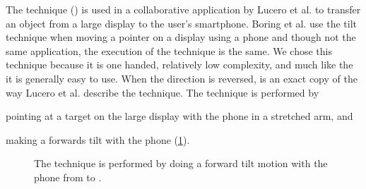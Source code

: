 The \tilt technique () is used in a collaborative application by Lucero et al. \cite{Lucero:2012} to transfer an object from a large display to the user's smartphone.
Boring et al. \cite{Boring:2009} use the tilt technique when moving a pointer on a display using a phone and though not the same application, the execution of the technique is the same.
We chose this technique because it is one handed, relatively low complexity, and much like the \swipe it is generally easy to use.
When the direction is reversed, \tilt is an exact copy of the way Lucero et al. describe the technique.
The \tilt technique is performed by 
\begin{enumerate*}[label=\itshape\roman*\upshape)]
	\item{pointing at a target on the large display with the phone in a stretched arm, and}
	\item{making a forwards tilt with the phone (\cref{fig:tiltTechnique}).}
\end{enumerate*}

\begin{figure}[H]
\caption{The \tilt technique is performed by doing a forward tilt motion with the phone from \protect{} to \protect{}.}
\label{fig:tiltTechnique}
\end{figure}

